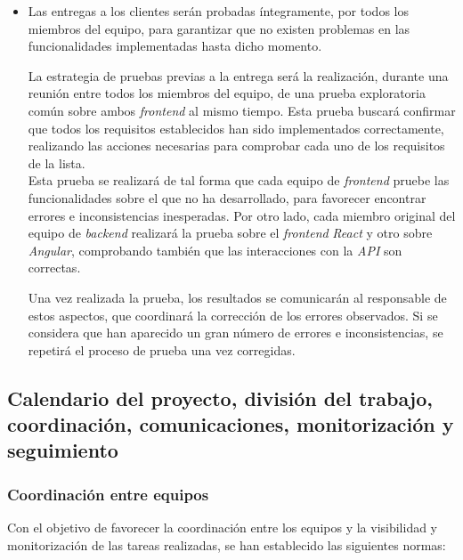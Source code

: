 \documentclass[11pt, a4paper, titlepage]{article}
\begin{document}
\begin{itemize}
    \item Las entregas a los clientes serán probadas íntegramente, por todos los miembros del equipo, para garantizar que no existen problemas en las funcionalidades implementadas hasta dicho momento.

    La estrategia de pruebas previas a la entrega será la realización, durante una reunión entre todos los miembros del equipo, de una prueba exploratoria común sobre ambos \textit{frontend} al mismo tiempo. Esta prueba buscará confirmar que todos los requisitos establecidos han sido implementados correctamente, realizando las acciones necesarias para comprobar cada uno de los requisitos de la lista. \\

    Esta prueba se realizará de tal forma que cada equipo de \textit{frontend} pruebe las funcionalidades sobre el que no ha desarrollado, para favorecer encontrar errores e inconsistencias inesperadas. Por otro lado, cada miembro original del equipo de \textit{backend} realizará la prueba sobre el \textit{frontend} \textit{React} y otro sobre \textit{Angular}, comprobando también que las interacciones con la \textit{API} son correctas.

    Una vez realizada la prueba, los resultados se comunicarán al responsable de estos aspectos, que coordinará la corrección de los errores observados. Si se considera que han aparecido un gran número de errores e inconsistencias, se repetirá el proceso de prueba una vez corregidas.
\end{itemize}


\subsection{Calendario del proyecto, división del trabajo, coordinación, comunicaciones, monitorización y seguimiento}


\subsubsection{Coordinación entre equipos}
Con el objetivo de favorecer la coordinación entre los equipos y la visibilidad y monitorización de las tareas realizadas, se han establecido las siguientes normas:\\
\end{document}
